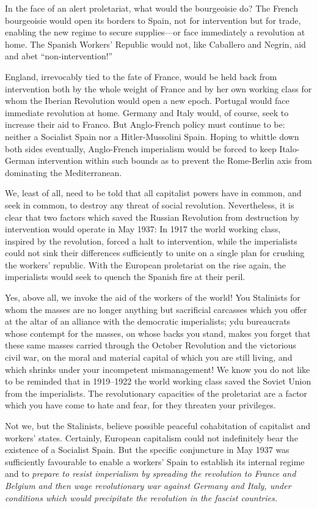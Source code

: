 In the face of an alert proletariat, what would the bourgeoisie do? The French bourgeoisie would open its borders to Spain, not for intervention but for trade, enabling the new regime to secure supplies---or face immediately a revolution at home. The Spanish Workers’ Republic would not, like Caballero and Negrin, aid and abet ``non-intervention!''

England, irrevocably tied to the fate of France, would be held back from intervention both by the whole weight of France and by her own working class for whom the Iberian Revolution would open a new epoch. Portugal would face immediate revolution at home. Germany and Italy would, of course, seek to increase their aid to Franco. But Anglo-French policy must continue to be: neither a Socialist Spain nor a Hitler-Mussolini Spain. Hoping to whittle down both sides eventually, Anglo-French imperialism would be forced to keep Italo-German intervention within such bounds as to prevent the Rome-Berlin axis from dominating the Mediterranean.

We, least of all, need to be told that all capitalist powers have in common, and seek in common, to destroy any threat of social revolution. Nevertheless, it is clear that two factors which saved the Russian Revolution from destruction by intervention would operate in May 1937: In 1917 the world working class, inspired by the revolution, forced a halt to intervention, while the imperialists could not sink their differences sufficiently to unite on a single plan for crushing the workers’ republic. With the European proletariat on the rise again, the imperialists would seek to quench the Spanish fire at their peril.

Yes, above all, we invoke the aid of the workers of the world! You Stalinists for whom the masses are no longer anything but sacrificial carcasses which you offer at the altar of an alliance with the democratic imperialists; ydu bureaucrats whose contempt for the masses, on whose backs you stand, makes you forget that these same masses carried through the October Revolution and the victorious civil war, on the moral and material capital of which you are still living, and which shrinks under your incompetent mismanagement! We know you do not like to be reminded that in 1919–1922 the world working class saved the Soviet Union from the imperialists. The revolutionary capacities of the proletariat are a factor which you have come to hate and fear, for they threaten your privileges.

Not we, but the Stalinists, believe possible peaceful cohabitation of capitalist and workers’ states. Certainly, European capitalism could not indefinitely bear the existence of a Socialist Spain. But the specific conjuncture in May 1937 was sufficiently favourable to enable a workers’ Spain to establish its internal regime and to \emph{prepare to resist imperialism by spreading the revolution to France and Belgium and then wage revolutionary war against Germany and Italy, under conditions which would precipitate the revolution in the fascist countries.}

